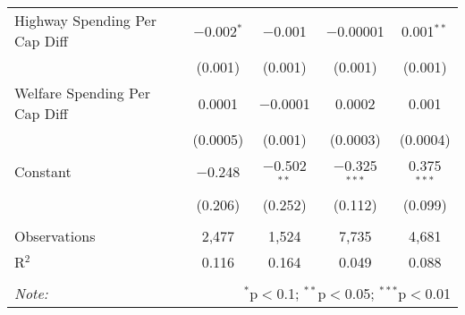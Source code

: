 \begin{table}[!htbp]
\begin{tabular}{@{\extracolsep{5pt}}lcccc}
  Highway Spending Per Cap Diff & $-$0.002$^{*}$ & $-$0.001 & $-$0.00001 & 0.001$^{**}$ \\ 
  & (0.001) & (0.001) & (0.001) & (0.001) \\ 
  Welfare Spending Per Cap Diff & 0.0001 & $-$0.0001 & 0.0002 & 0.001 \\ 
  & (0.0005) & (0.001) & (0.0003) & (0.0004) \\ 
  Constant & $-$0.248 & $-$0.502$^{**}$ & $-$0.325$^{***}$ & 0.375$^{***}$ \\ 
  & (0.206) & (0.252) & (0.112) & (0.099) \\ 
 \hline \\[-1.8ex] 
Observations & 2,477 & 1,524 & 7,735 & 4,681 \\ 
R$^{2}$ & 0.116 & 0.164 & 0.049 & 0.088 \\ 
\hline 
\hline \\[-1.8ex] 
\textit{Note:}  & \multicolumn{4}{r}{$^{*}$p$<$0.1; $^{**}$p$<$0.05; $^{***}$p$<$0.01} \\ 
\end{tabular} 
\end{table} 

